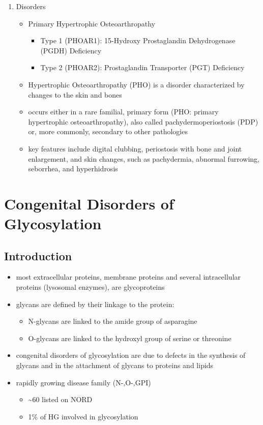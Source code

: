 \documentclass{scrartcl}
\begin{document}
\begin{enumerate}
\item Disorders
\label{sec:orge82e173}
\begin{itemize}
\item Primary Hypertrophic Osteoarthropathy
\begin{itemize}
\item Type 1 (PHOAR1): 15-Hydroxy Prostaglandin Dehydrogenase (PGDH) Deficiency
\item Type 2 (PHOAR2): Prostaglandin Transporter (PGT) Deficiency
\end{itemize}

\item Hypertrophic Osteoarthropathy (PHO) is a disorder characterized by
changes to the skin and bones

\item occurs either in a rare familial, primary form (PHO: primary
hypertrophic osteoarthropathy), also called pachydermoperiostosis
(PDP) or, more commonly, secondary to other pathologies

\item key features include digital clubbing, periostosis with bone and
joint enlargement, and skin changes, such as pachydermia, abnormal
furrowing, seborrhea, and hyperhidrosis
\end{itemize}
\end{enumerate}
\section{Congenital Disorders of Glycosylation}
\label{sec:orgaeb010b}
\subsection{Introduction}
\label{sec:org38f2254}
\begin{itemize}
\item most extracellular proteins, membrane proteins and several
intracellular proteins (lysosomal enzymes), are glycoproteins

\item glycans are defined by their linkage to the protein:
\begin{itemize}
\item N-glycans are linked to the amide group of asparagine
\item O-glycans are linked to the hydroxyl group of serine or
threonine
\end{itemize}

\item congenital disorders of glycosylation are due to defects in the
synthesis of glycans and in the attachment of glycans to proteins
and lipids
\item rapidly growing disease family (N-,O-,GPI)
\begin{itemize}
\item \textasciitilde{}60 listed on NORD
\item 1\% of HG involved in glycosylation
\end{itemize}
\end{itemize}
\end{document}
